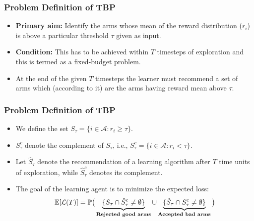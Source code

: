 \begin{frame}
\frametitle{Problem Definition of TBP}
\begin{itemize}
\item<1-> \textbf{Primary aim:} Identify the arms whose mean of the reward distribution ($r_i$) is above a particular threshold $\tau$ given as input.
\item<2-> \textbf{Condition:} This has to be achieved within $T$ timesteps of exploration and this is termed as a fixed-budget problem.
\item<3-> At the end of the given $T$ timesteps the learner must recommend a set of arms which (according to it) are the arms having reward mean above $\tau$.
\end{itemize}
\end{frame}

\begin{frame}
\frametitle{Problem Definition of TBP}
\begin{itemize}
\item<1-> We define the set $S_{\tau}=\lbrace i\in \mathcal{A}: r_{i}\geq \tau \rbrace$. 
\item<2-> $S_\tau^c$ denote the complement of $S_\tau$, i.e.,  $S_{\tau}^{c}=\lbrace i\in \mathcal{A}: r_{i} < \tau \rbrace$. 
\item<3-> Let $\hat{S}_{\tau}$ denote the recommendation of a learning algorithm after $T$ time units of exploration, while $\hat{S}_{\tau}^c$ denotes its complement.


\item<4-> The goal of the learning agent is to minimize the expected loss:
\begin{align*}
\mathbb{E}[\mathcal{L}(T)] &= \mathbb{P}\big(\underbrace{\lbrace S_{\tau}\cap \hat{S}_{\tau}^{c} \neq \emptyset \rbrace}_{\textbf{Rejected good arms}}  \cup   \underbrace{\lbrace \hat{S}_{\tau}\cap S_{\tau}^{c} \neq \emptyset\rbrace}_{\textbf{Accepted bad arms}}\big) \\
\end{align*}
\end{itemize}
\end{frame}

